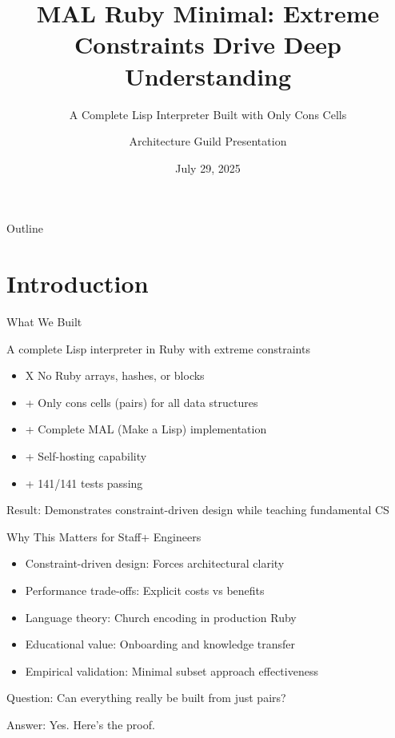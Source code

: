 \documentclass[presentation,aspectratio=169]{beamer}
\author{Architecture Guild Presentation}
\date{July 29, 2025}
\title{MAL Ruby Minimal: Extreme Constraints Drive Deep Understanding}
\subtitle{A Complete Lisp Interpreter Built with Only Cons Cells}
\begin{document}
\maketitle
\begin{frame}{Outline}
\tableofcontents
\end{frame}

\section{Introduction}
\label{sec:org830788d}

\begin{frame}[label={sec:org7494e23}]{What We Built}
\begin{center}
A complete Lisp interpreter in Ruby with \alert{extreme constraints}
\end{center}

\begin{itemize}
\item X No Ruby arrays, hashes, or blocks
\item + Only cons cells (pairs) for all data structures
\item + Complete MAL (Make a Lisp) implementation
\item + Self-hosting capability
\item + 141/141 tests passing
\end{itemize}

\pause

\begin{center}
\alert{Result}: Demonstrates constraint-driven design while teaching fundamental CS
\end{center}
\end{frame}
\begin{frame}[label={sec:org98a987e}]{Why This Matters for Staff+ Engineers}
\begin{itemize}[<+->]
\item \alert{Constraint-driven design}: Forces architectural clarity
\item \alert{Performance trade-offs}: Explicit costs vs benefits
\item \alert{Language theory}: Church encoding in production Ruby
\item \alert{Educational value}: Onboarding and knowledge transfer
\item \alert{Empirical validation}: Minimal subset approach effectiveness
\end{itemize}

\pause

\begin{center}
\alert{Question}: Can everything really be built from just pairs?
\end{center}

\pause

\begin{center}
\alert{Answer}: Yes. Here's the proof.
\end{center}
\end{frame}
\end{document}
